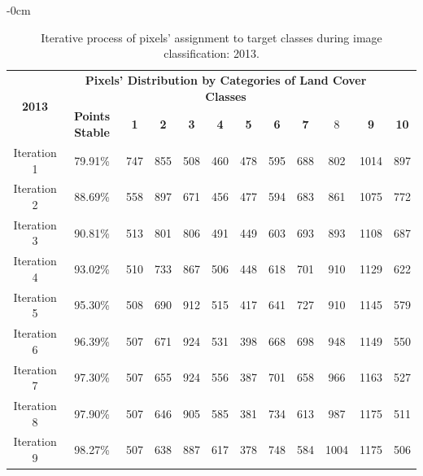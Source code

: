 \documentclass[jmse,article,accept,pdftex,oneauthor]{Definitions/mdpi}
\begin{document}
\vspace{-6pt}
\begin{table}[H]
  \caption{Iterative process of pixels' assignment to target classes during image classification: 2013.  \label{tabB1}}
 \setlength{\tabcolsep}{3.8mm}

\begin{adjustwidth}{-\extralength}{0cm}
   \begin{tabular}{cccccccccccc}
  \toprule
  \multirow{2}{*}{\textbf{2013}} & \multicolumn{10}{c}{\textbf{Pixels' Distribution by Categories of Land Cover Classes}} \\
    & \textbf{Points Stable} & \textbf{1} & \textbf{2} &  \textbf{3} & \textbf{4} & \textbf{5} & \textbf{6} & \textbf{7} & 8 & \textbf{9} & \textbf{10} \\
    \midrule
    Iteration 1 & 79.91\% & 747 & 855 & 508 & 460 & 478 & 595 & 688 & 802 & 1014 & 897 \\
    Iteration 2 & 88.69\% & 558 & 897 & 671 & 456 & 477& 594 &683 & 861& 1075 &772 \\
    Iteration 3 & 90.81\% & 513 & 801 & 806 & 491 & 449 & 603 & 693 & 893 & 1108 & 687 \\
    Iteration 4 & 93.02\% & 510  & 733 & 867 & 506 & 448 & 618 & 701 & 910 & 1129 & 622 \\
    Iteration 5 & 95.30\% & 508 & 690 & 912 & 515 & 417 & 641  & 727& 910 &1145 &579\\
    Iteration 6 & 96.39\% & 507 & 671 & 924 &531 &398 & 668 & 698 & 948 &1149  &550 \\
    Iteration 7 & 97.30\% &  507 & 655 & 924 & 556 & 387& 701& 658 & 966 &1163 & 527\\
    Iteration 8 & 97.90\% &  507 & 646 & 905 &585 &381 & 734 & 613 &987 & 1175 &511 \\
    Iteration 9 & 98.27\% & 507 & 638  & 887 &617 & 378 &748 & 584 &1004 &1175  &506\\
\bottomrule
\end{tabular}
\end{adjustwidth}

 
\end{table}
\unskip
\end{document}
